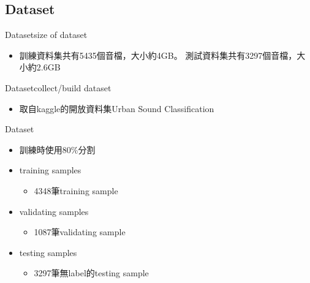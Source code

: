 \documentclass{beamer}
\begin{document}
\begin{CJK}{UTF8}{bsmi}
\section{Dataset}
\begin{frame}{Dataset}{size of dataset}
  \begin{itemize}
  \item {
    訓練資料集共有5435個音檔，大小約4GB。 測試資料集共有3297個音檔，大小約2.6GB
  }
  \end{itemize}
\end{frame}
\begin{frame}{Dataset}{collect/build dataset}
  \begin{itemize}
  \item {
    取自kaggle的開放資料集Urban Sound Classification
  }
  \end{itemize}
\end{frame}
\begin{frame}{Dataset}
 \begin{itemize}
  \item {
訓練時使用80\%分割
  }
  \end{itemize}
  \begin{itemize}
  \item {
    training samples  
 	\begin{itemize}
    	\item
     	4348筆training sample
   	 \end{itemize}
  }
  \end{itemize}
 \begin{itemize}
  \item {
   validating samples 
 	\begin{itemize}
    	\item
     	 1087筆validating sample
   	 \end{itemize}
  }
  \end{itemize}
 \begin{itemize}
  \item {
    testing samples 
 	\begin{itemize}
    	\item
     	 3297筆無label的testing sample
   	 \end{itemize}
  }
  \end{itemize}

\end{frame}


\end{CJK}
\end{document}
